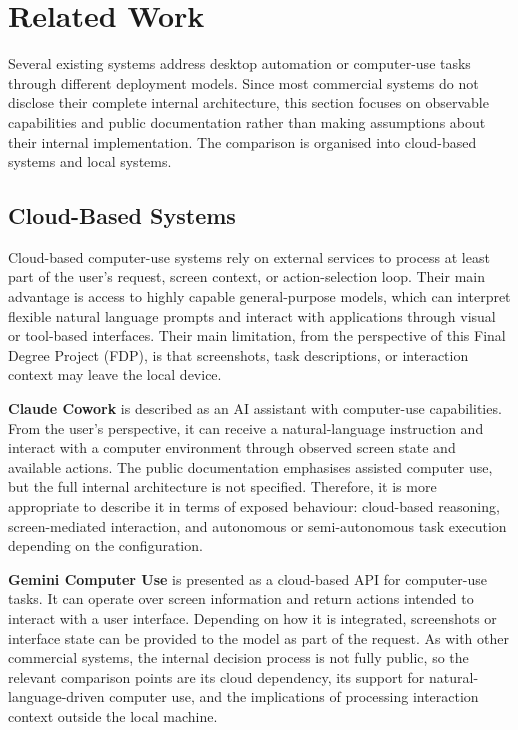 \section{Related Work}
\label{sec:related_work}

Several existing systems address desktop automation or computer-use tasks through different deployment models. Since most commercial systems do not disclose their complete internal architecture, this section focuses on observable capabilities and public documentation rather than making assumptions about their internal implementation. The comparison is organised into cloud-based systems and local systems.

\subsection{Cloud-Based Systems}

Cloud-based computer-use systems rely on external services to process at least part of the user's request, screen context, or action-selection loop. Their main advantage is access to highly capable general-purpose models, which can interpret flexible natural language prompts and interact with applications through visual or tool-based interfaces. Their main limitation, from the perspective of this Final Degree Project (FDP), is that screenshots, task descriptions, or interaction context may leave the local device.

\noindent\textbf{Claude Cowork} \cite{claude_cowork} is described as an AI assistant with computer-use capabilities. From the user's perspective, it can receive a natural-language instruction and interact with a computer environment through observed screen state and available actions. The public documentation emphasises assisted computer use, but the full internal architecture is not specified. Therefore, it is more appropriate to describe it in terms of exposed behaviour: cloud-based reasoning, screen-mediated interaction, and autonomous or semi-autonomous task execution depending on the configuration.

\noindent\textbf{Gemini Computer Use} \cite{gemini_cu} is presented as a cloud-based API for computer-use tasks. It can operate over screen information and return actions intended to interact with a user interface. Depending on how it is integrated, screenshots or interface state can be provided to the model as part of the request. As with other commercial systems, the internal decision process is not fully public, so the relevant comparison points are its cloud dependency, its support for natural-language-driven computer use, and the implications of processing interaction context outside the local machine.


